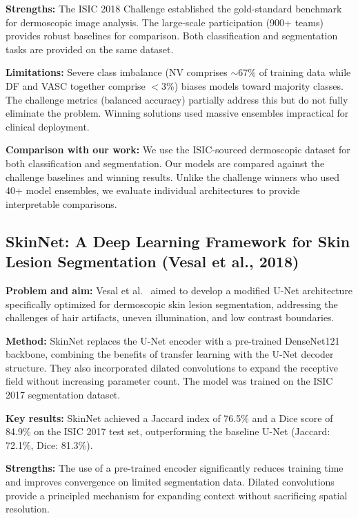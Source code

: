 \documentclass[10pt,twocolumn]{article}
\begin{document}
\textbf{Strengths:} The ISIC 2018 Challenge established the gold-standard benchmark for dermoscopic image analysis. The large-scale participation (900+ teams) provides robust baselines for comparison. Both classification and segmentation tasks are provided on the same dataset.

\textbf{Limitations:} Severe class imbalance (NV comprises $\sim$67\% of training data while DF and VASC together comprise $<$3\%) biases models toward majority classes. The challenge metrics (balanced accuracy) partially address this but do not fully eliminate the problem. Winning solutions used massive ensembles impractical for clinical deployment.

\textbf{Comparison with our work:} We use the ISIC-sourced dermoscopic dataset for both classification and segmentation. Our models are compared against the challenge baselines and winning results. Unlike the challenge winners who used 40+ model ensembles, we evaluate individual architectures to provide interpretable comparisons.

\subsection{SkinNet: A Deep Learning Framework for Skin Lesion Segmentation (Vesal et al., 2018)}

\textbf{Problem and aim:} Vesal et al.\ \cite{Vesal2018} aimed to develop a modified U-Net architecture specifically optimized for dermoscopic skin lesion segmentation, addressing the challenges of hair artifacts, uneven illumination, and low contrast boundaries.

\textbf{Method:} SkinNet replaces the U-Net encoder with a pre-trained DenseNet121 backbone, combining the benefits of transfer learning with the U-Net decoder structure. They also incorporated dilated convolutions to expand the receptive field without increasing parameter count. The model was trained on the ISIC 2017 segmentation dataset.

\textbf{Key results:} SkinNet achieved a Jaccard index of 76.5\% and a Dice score of 84.9\% on the ISIC 2017 test set, outperforming the baseline U-Net (Jaccard: 72.1\%, Dice: 81.3\%).

\textbf{Strengths:} The use of a pre-trained encoder significantly reduces training time and improves convergence on limited segmentation data. Dilated convolutions provide a principled mechanism for expanding context without sacrificing spatial resolution.
\end{document}
